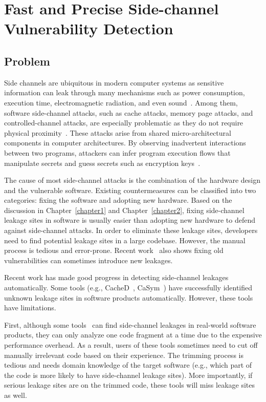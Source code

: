 
\chapter{Fast and Precise Side-channel Vulnerability Detection}\label{chapter3}
\section{Problem}
Side channels are ubiquitous in modern computer systems as sensitive information can leak through many mechanisms such as power consumption, execution time, electromagnetic radiation, and even sound~\cite{agrawal2002side,kar20178,chari1999towards,217605,genkin2014rsa}.  Among them, software side-channel attacks, such as cache attacks, memory page attacks, and controlled-channel attacks, are especially problematic as they do not require physical proximity~\cite{7163052,217543,217589,lee2017inferring,191010,liu2015last}. These attacks arise from shared micro-architectural components in computer architectures. By observing inadvertent interactions between two programs, attackers can infer program execution flows that manipulate secrets and guess secrets such as encryption keys~\cite{Osvik2006,Gullasch:2011:CGB:2006077.2006784,203878,10.1007/978-3-540-45238-6_6}.

The cause of most side-channel attacks is the combination of the hardware design and the vulnerable software. Existing countermeasures can be classified into two categories: fixing the software and adopting new hardware. Based on the discussion in Chapter~\ref{chapter1} and Chapter~\ref{chapter2}, fixing side-channel leakage sites in software is usually easier than adopting new hardware to defend against side-channel attacks. In order to eliminate these leakage sites, developers need to find potential leakage sites in a large codebase. However, the manual process is tedious and error-prone. Recent work~\cite{203878} also shows fixing old vulnerabilities can sometimes introduce new leakages.

Recent work has made good progress in detecting side-channel leakages automatically. Some tools (e.g., CacheD~\cite{203878}, CaSym~\cite{Brotzman19Casym}) have successfully identified unknown leakage sites in software products automatically. However, these tools have limitations.

First, although some tools~\cite{Brotzman19Casym} can find side-channel leakages in real-world software products, they can only analyze one code fragment at a time due to the expensive performance overhead. As a result, users of these tools sometimes need to cut off manually irrelevant code based on their experience. The trimming process is tedious and needs domain knowledge of the target software (e.g., which part of the code is more likely to have side-channel leakage sites). More importantly, if serious leakage sites are on the trimmed code, these tools will miss leakage sites as well.

